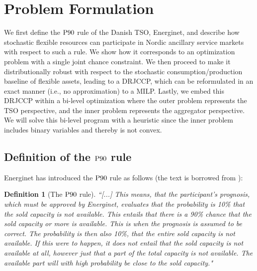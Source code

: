 \documentclass[conference]{IEEEtran}
\newtheorem{definition}{Definition} %
\begin{document}
\section{Problem Formulation}\label{sec:problem-formulation}
\vspace{-1mm}
We first define the $\rm{P90}$ rule of the Danish TSO, Energinet, and describe how stochastic flexible resources can participate in Nordic ancillary service markets with respect to such a rule. We show how it corresponds to an optimization problem with a single joint chance constraint. We then proceed to make it distributionally robust with respect to the stochastic consumption/production baseline of  flexible assets, leading to a  \ac{DRJCCP}, which can be  reformulated in an exact manner (i.e., no approximation) to a \ac{MILP}. Lastly, we embed this \ac{DRJCCP} within a bi-level optimization where the outer problem represents the \ac{TSO} perspective, and the inner problem represents the aggregator perspective. We will solve this bi-level program with a heuristic since the inner problem includes binary variables and thereby is not convex. 

\vspace{2mm}
\subsection{Definition of the $\rm{P90}$ rule}
\vspace{-1mm}
Energinet has introduced the $\rm{P90}$ rule as follows (the text is borrowed from \cite{energinet}): 
%
%
\begin{definition}[The $\rm{P90}$ rule]\label{def:P90}
    \textit{``[...] This means, that the participant's prognosis, which must be approved by Energinet, evaluates that the probability is 10\% that the sold capacity is not available. This entails that there is a 90\% chance that the sold capacity or more is available. This is when the prognosis is assumed to be correct.
    The probability is then also 10\%, that the entire sold capacity is not available. If this were to happen, it does not entail that the sold capacity is not available at all, however just that a part of the total capacity is not available. The available part will with high probability be close to the sold capacity."}
\end{definition}
\end{document}
